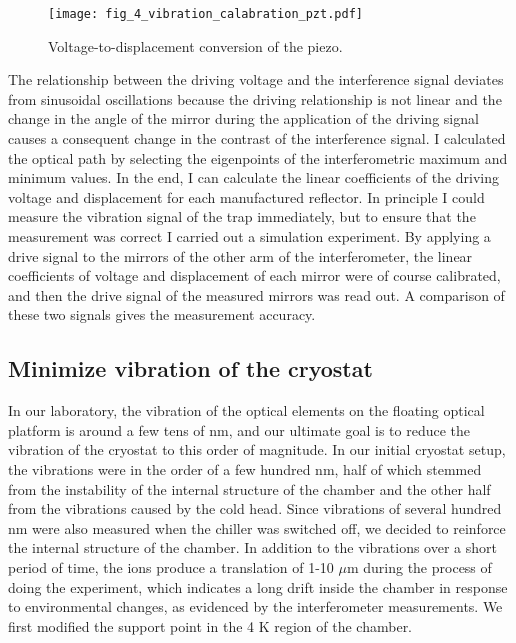 \begin{figure}
    \centering
    \texttt{[image: fig\_4\_vibration\_calabration\_pzt.pdf]}
    \caption{Voltage-to-displacement conversion of the piezo.}
    \label{fig:fig_4_vibration_calabration_pzt}
\end{figure}

The relationship between the driving voltage and the interference signal deviates from sinusoidal oscillations because the driving relationship is not linear and the change in the angle of the mirror during the application of the driving signal causes a consequent change in the contrast of the interference signal. I calculated the optical path by selecting the eigenpoints of the interferometric maximum and minimum values. In the end, I can calculate the linear coefficients of the driving voltage and displacement for each manufactured reflector. In principle I could measure the vibration signal of the trap immediately, but to ensure that the measurement was correct I carried out a simulation experiment. By applying a drive signal to the mirrors of the other arm of the interferometer, the linear coefficients of voltage and displacement of each mirror were of course calibrated, and then the drive signal of the measured mirrors was read out. A comparison of these two signals gives the measurement accuracy.

\subsection{Minimize vibration of the cryostat}

In our laboratory, the vibration of the optical elements on the floating optical platform is around a few tens of nm, and our ultimate goal is to reduce the vibration of the cryostat to this order of magnitude. In our initial cryostat setup, the vibrations were in the order of a few hundred nm, half of which stemmed from the instability of the internal structure of the chamber and the other half from the vibrations caused by the cold head. Since vibrations of several hundred nm were also measured when the chiller was switched off, we decided to reinforce the internal structure of the chamber. In addition to the vibrations over a short period of time, the ions produce a translation of 1-10 $\mu$m during the process of doing the experiment, which indicates a long drift inside the chamber in response to environmental changes, as evidenced by the interferometer measurements. We first modified the support point in the 4 K region of the chamber.

